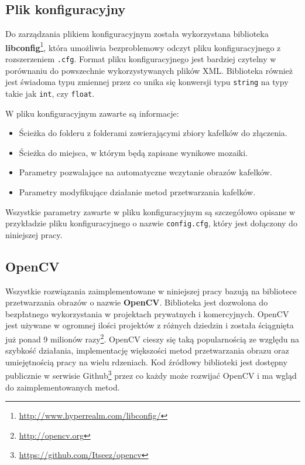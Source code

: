 \subsection{Plik konfiguracyjny}
\label{sec:proponowane_algorytmy:plik_configuracyjny}

Do zarządzania plikiem konfiguracyjnym została wykorzystana biblioteka \textbf{libconfig}\footnote{\url{http://www.hyperrealm.com/libconfig/}}, która umożliwia bezproblemowy odczyt pliku konfiguracyjnego z rozszerzeniem \texttt{.cfg}. Format pliku konfiguracyjnego jest bardziej czytelny w porównaniu do powszechnie wykorzystywanych plików XML. Biblioteka również jest świadoma typu zmiennej przez co unika się konwersji typu \texttt{string} na typy takie jak \texttt{int}, czy \texttt{float}.

W pliku konfiguracyjnym zawarte są informacje:

\begin{itemize}
\item Ścieżka do folderu z folderami zawierającymi zbiory kafelków do złączenia.
\item Ścieżka do miejsca, w którym będą zapisane wynikowe mozaiki.
\item Parametry pozwalające na automatyczne wczytanie obrazów kafelków.
\item Parametry modyfikujące działanie metod przetwarzania kafelków.
\end{itemize}

Wszystkie parametry zawarte w pliku konfiguracyjnym są szczegółowo opisane w przykładzie pliku konfiguracyjnego o nazwie \texttt{config.cfg}, który jest dołączony do niniejszej pracy.

\subsection{OpenCV}
\label{sec:proponowane_algorytmy:opencv}

Wszystkie rozwiązania zaimplementowane w niniejszej pracy bazują na bibliotece przetwarzania obrazów o nazwie \textbf{OpenCV}. Biblioteka jest dozwolona do bezpłatnego wykorzystania w projektach prywatnych i komercyjnych. OpenCV jest używane w ogromnej ilości projektów z różnych dziedzin i została ściągnięta już ponad 9 milionów razy\footnote{\url{http://opencv.org}}. OpenCV cieszy się taką popularnością ze względu na szybkość działania, implementację większości metod przetwarzania obrazu oraz umiejętnością pracy na wielu rdzeniach. Kod źródłowy biblioteki jest dostępny publicznie w serwisie Github\footnote{\url{https://github.com/Itseez/opencv}} przez co każdy może rozwijać OpenCV i ma wgląd do zaimplementowanych metod.

